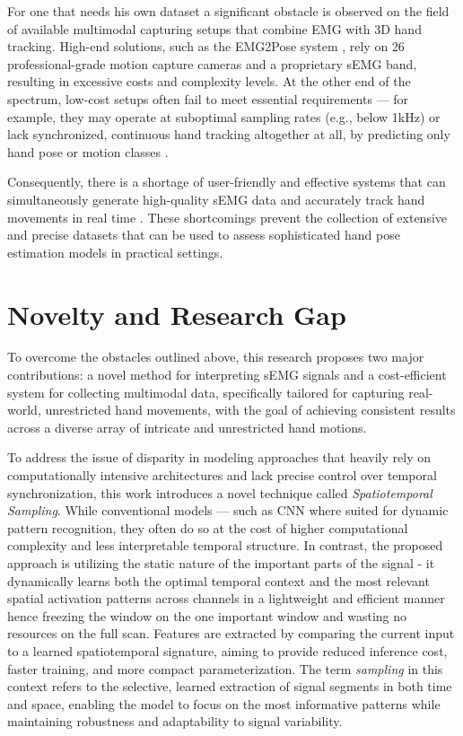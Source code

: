 For one that needs his own dataset a significant obstacle is observed on the field of available multimodal capturing setups that combine EMG with 3D hand tracking. High-end solutions, such as the EMG2Pose system \cite{salter2024emg2pose}, rely on 26 professional-grade motion capture cameras and a proprietary sEMG band, resulting in excessive costs and complexity levels. At the other end of the spectrum, low-cost setups often fail to meet essential requirements — for example, they may operate at suboptimal sampling rates (e.g., below 1kHz) or lack synchronized, continuous hand tracking altogether at all, by predicting only hand pose or motion classes \cite{nasri2020semg}.

Consequently, there is a shortage of user-friendly and effective systems that can simultaneously generate high-quality sEMG data and accurately track hand movements in real time \cite{graf2023combining}. These shortcomings prevent the collection of extensive and precise datasets that can be used to assess sophisticated hand pose estimation models in practical settings.

\section{Novelty and Research Gap}

To overcome the obstacles outlined above, this research proposes two major contributions: a novel method for interpreting sEMG signals and a cost-efficient system for collecting multimodal data, specifically tailored for capturing real-world, unrestricted hand movements, with the goal of achieving consistent results across a diverse array of intricate and unrestricted hand motions.

To address the issue of disparity in modeling approaches that heavily rely on computationally intensive architectures and lack precise control over temporal synchronization, this work introduces a novel technique called \textit{Spatiotemporal Sampling}. While conventional models — such as CNN where suited for dynamic pattern recognition, they often do so at the cost of higher computational complexity and less interpretable temporal structure. In contrast, the proposed approach is utilizing the static nature of the important parts of the signal - it dynamically learns both the optimal temporal context and the most relevant spatial activation patterns across channels in a lightweight and efficient manner hence freezing the window on the one important window and wasting no resources on the full scan. Features are extracted by comparing the current input to a learned spatiotemporal signature, aiming to provide reduced inference cost, faster training, and more compact parameterization. The term \textit{sampling} in this context refers to the selective, learned extraction of signal segments in both time and space, enabling the model to focus on the most informative patterns while maintaining robustness and adaptability to signal variability.

